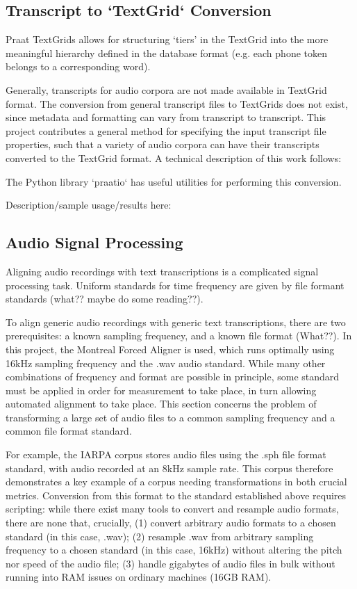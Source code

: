 \documentclass[11pt]{article}
\begin{document}
\subsection{Transcript to `TextGrid` Conversion}

Praat\cite{noauthor_praat_nodate} TextGrids allows for structuring ‘tiers’ in the TextGrid into the more meaningful hierarchy defined in the database format (e.g. each phone token belongs to a corresponding word).

Generally, transcripts for audio corpora are not made available in TextGrid format. The conversion from general transcript files to TextGrids does not exist, since metadata and formatting can vary from transcript to transcript. This project contributes a general method for specifying the input transcript file properties, such that a variety of audio corpora can have their transcripts converted to the TextGrid format. A technical description of this work follows:

The Python library `praatio` \cite{tim_mahrt_praatio_2016} has useful utilities for performing this conversion.

Description/sample usage/results here:

\subsection{Audio Signal Processing}

Aligning audio recordings with text transcriptions is a complicated signal processing task. Uniform standards for time frequency are given by file formant standards (what?? maybe do some reading??).

To align generic audio recordings with generic text transcriptions, there are two prerequisites: a known sampling frequency, and a known file format (What??). In this project, the Montreal Forced Aligner is used, which runs optimally using 16kHz sampling frequency and the .wav audio standard. While many other combinations of frequency and format are possible in principle, some standard must be applied in order for measurement to take place, in turn allowing automated alignment to take place. This section concerns the problem of transforming a large set of audio files to a common sampling frequency and a common file format standard.

For example, the IARPA corpus stores audio files using the .sph file format standard, with audio recorded at an 8kHz sample rate. This corpus therefore demonstrates a key example of a corpus needing transformations in both crucial metrics. Conversion from this format to the standard established above requires scripting: while there exist many tools to convert and resample audio formats, there are none that, crucially, (1) convert arbitrary audio formats to a chosen standard (in this case, .wav); (2) resample .wav from arbitrary sampling frequency to a chosen standard (in this case, 16kHz) without altering the pitch nor speed of the audio file; (3) handle gigabytes of audio files in bulk without running into RAM issues on ordinary machines (16GB RAM).
\end{document}
